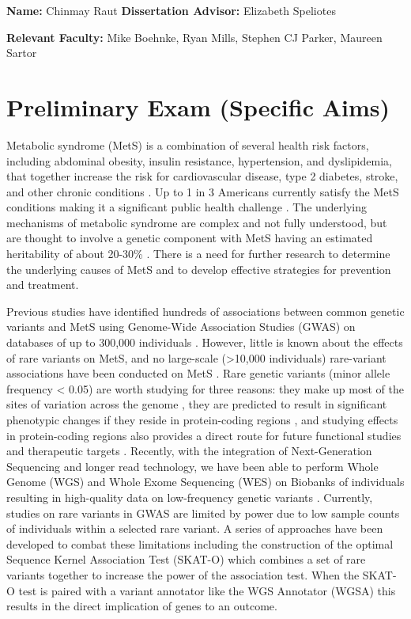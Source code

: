\documentclass[11pt]{article}
\begin{document}
\noindent
\textbf{Name:} Chinmay Raut \textbf{Dissertation Advisor:} Elizabeth Speliotes

\noindent
\textbf{Relevant Faculty: } Mike Boehnke, Ryan Mills, Stephen CJ Parker, Maureen Sartor

\section*{Preliminary Exam (Specific Aims)}

Metabolic syndrome (MetS) is a combination of several health risk factors, including abdominal obesity, insulin resistance, hypertension, and dyslipidemia, that together increase the risk for cardiovascular disease, type 2 diabetes, stroke, and other chronic conditions \cite{pmid29480368}. Up to 1 in 3 Americans currently satisfy the MetS conditions making it a significant public health challenge \cite{pmid29480368}. The underlying mechanisms of metabolic syndrome are complex and not fully understood, but are thought to involve a genetic component with MetS having an estimated heritability of about 20-30\% \cite{Graziano2019}. There is a need for further research to determine the underlying causes of MetS and to develop effective strategies for prevention and treatment.

Previous studies have identified hundreds of associations between common genetic variants and MetS using Genome-Wide Association Studies (GWAS) on databases of up to 300,000 individuals \cite{pmid31589552}. However, little is known about the effects of rare variants on MetS, and no large-scale (>10,000 individuals) rare-variant associations have been conducted on MetS \cite{Lee2018}. Rare genetic variants (minor allele frequency  < 0.05) are worth studying for three reasons: they make up most of the sites of variation across the genome \cite{pmid34662886}, they are predicted to result in significant phenotypic changes if they reside in protein-coding regions \cite{pmid34662886}, and studying effects in protein-coding regions also provides a direct route for future functional studies and therapeutic targets \cite{doi:10.1056/NEJMoa2117872}. Recently, with the integration of Next-Generation Sequencing and longer read technology, we have been able to perform Whole Genome (WGS) and Whole Exome Sequencing (WES) on Biobanks of individuals resulting in high-quality data on low-frequency genetic variants \cite{pmid34662886}. Currently, studies on rare variants in GWAS are limited by power due to low sample counts of individuals within a selected rare variant. A series of approaches have been developed to combat these limitations including the construction of the optimal Sequence Kernel Association Test (SKAT-O) \cite{pmid22863193} which combines a set of rare variants together to increase the power of the association test. When the SKAT-O test is paired with a variant annotator like the WGS Annotator (WGSA) \cite{pmid26395054} this results in the direct implication of genes to an outcome.
\end{document}
